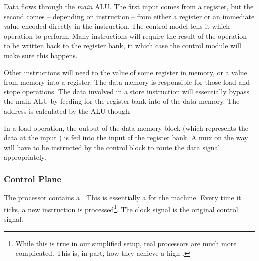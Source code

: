 Data flows through the \textsl{main} ALU. The first input comes from a register, but the second comes -- depending on instruction -- from either a register or an immediate value encoded directly in the instruction. The control model tells it which operation to perform. Many instructions will require the result of the operation to be written back to the register bank, in which case the control module will make sure this happens.

Other instructions will need to  the value of some register in memory, or  a value from memory into a register. The data memory is responsible for those load and stope operations. The data involved in a store instruction will essentially bypass the main ALU by feeding  for the register bank into  of the data memory. The address is calculated by the ALU though.

In a load operation, the  output of the data memory block (which represents the data at the input ) is fed into the  input of the register bank. A mux on the way will have to be instructed by the control block to route the data signal appropriately.


\subsubsection{Control Plane}
\label{sec:bg:machine:control_plane}

The processor contains a . This is essentially a  for the machine. Every time it ticks, a new instruction is processed\footnote{While this is true in our simplified setup, real processors are much more complicated. This is, in part, how they achieve a high .}. The clock signal is the original control signal.

